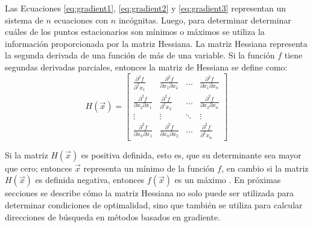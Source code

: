 Las Ecuaciones \ref{eq:gradient1}, \ref{eq:gradient2} y \ref{eq:gradient3} representan un sistema de $n$ ecuaciones con $n$ incógnitas. Luego, para determinar determinar cuáles de los puntos estacionarios son mínimos o máximos se utiliza la información proporcionada por la matriz Hessiana. La matriz Hessiana representa la segunda derivada de una función de más de una variable. Si la función $f$ tiene segundas derivadas parciales, entonces la matriz de Hessiana se define como:
\begin{equation}
 H(\vec{x})=
 \begin{bmatrix}
    \frac{\partial^2 f}{\partial^2 x_1} & \frac{\partial^2 f}{\partial x_1 \partial x_2} & \dots  & \frac{\partial^2 f}{\partial x_1 \partial x_n} \\
    \frac{\partial^2 f}{\partial x_2 \partial x_1} & \frac{\partial^2 f}{\partial^2 x_2} & \dots  & \frac{\partial^2 f}{\partial x_2 \partial x_n}\\
    \vdots & \vdots & \ddots & \vdots \\
    \frac{\partial^2 f}{\partial x_n \partial x_1} & \frac{\partial^2 f}{\partial x_n \partial x_2} & \dots  & \frac{\partial^2 f}{\partial^2 x_n }
\end{bmatrix}
 \end{equation}

Si la matriz $H(\vec{x})$ es positiva definida, esto es, que su determinante sea mayor que cero; entonces $\vec{x}$ representa un mínimo de la función $f$, en cambio si la matriz $H(\vec{x})$ es definida negativa, entonces $f(\vec{x})$ es un máximo \cite{antoniou_practical_2007}. En próximas secciones se describe cómo la matriz Hessiana no solo puede ser utilizada para determinar condiciones de optimalidad, sino que también se utiliza para calcular direcciones de búsqueda en métodos basados en gradiente.

